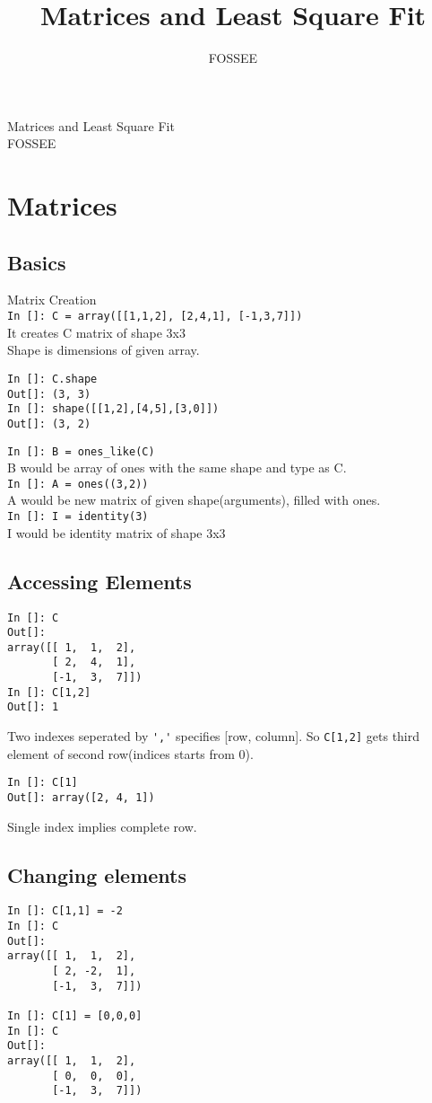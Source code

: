 \documentclass[12pt]{article}
\title{Matrices and Least Square Fit}
\author{FOSSEE}
\newcommand{\typ}[1]{\lstinline{#1}}
\begin{document}
\date{}
\vspace{-1in}
\begin{center}
\LARGE{Matrices and Least Square Fit}\\
\large{FOSSEE}
\end{center}
\section{Matrices}
\subsection{Basics}
Matrix Creation\\
\typ{In []: C = array([[1,1,2], [2,4,1], [-1,3,7]])}\\
It creates C matrix of shape 3x3\\
Shape is dimensions of given array.
\begin{lstlisting}
In []: C.shape 
Out[]: (3, 3)
In []: shape([[1,2],[4,5],[3,0]])
Out[]: (3, 2)
\end{lstlisting}
\typ{In []: B = ones_like(C)} \\
B would be array of ones with the same shape and type as C.\\
\typ{In []: A = ones((3,2))} \\
A would be new matrix of given shape(arguments), filled with ones.\\ 
\typ{In []: I = identity(3)}\\
I would be identity matrix of shape 3x3

\subsection{Accessing Elements}
\begin{lstlisting}
In []: C
Out[]: 
array([[ 1,  1,  2],
       [ 2,  4,  1],
       [-1,  3,  7]])
In []: C[1,2]
Out[]: 1
\end{lstlisting}
Two indexes seperated by \typ{','} specifies [row, column]. So \typ{C[1,2]} gets third element of second row(indices starts from 0).
\newpage
\begin{lstlisting}
In []: C[1]
Out[]: array([2, 4, 1])
\end{lstlisting}
Single index implies complete row.
\subsection{Changing elements}
\begin{lstlisting}
In []: C[1,1] = -2
In []: C
Out[]: 
array([[ 1,  1,  2],
       [ 2, -2,  1],
       [-1,  3,  7]])

In []: C[1] = [0,0,0]
In []: C
Out[]: 
array([[ 1,  1,  2],
       [ 0,  0,  0],
       [-1,  3,  7]])
\end{lstlisting}
\end{document}
